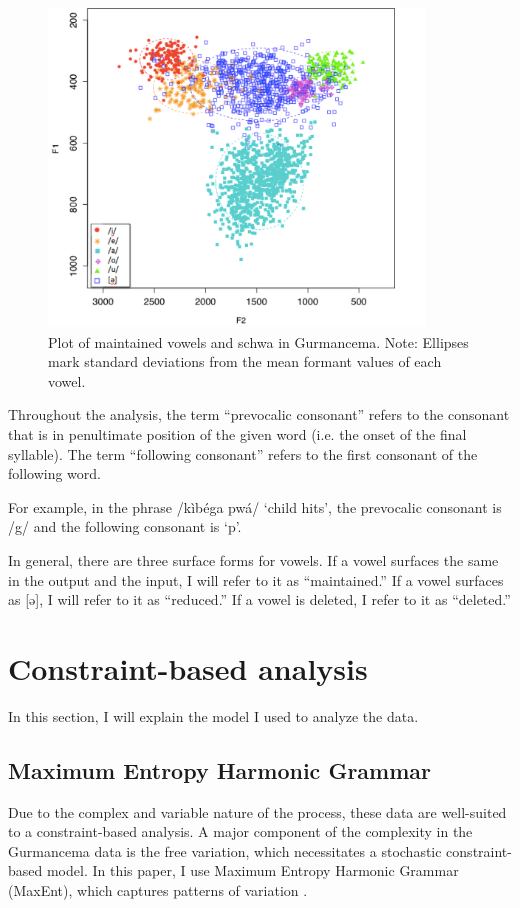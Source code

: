 \documentclass[output=paper,newtxmath,modfonts,nonflat,draftmode]{langsci/langscibook}
\begin{document}
\begin{figure} 
\includegraphics[width=10cm]{figures/ACAL_Vowel_plot.png} %
\caption{Plot of maintained vowels and schwa in Gurmancema. Note: Ellipses mark standard deviations from the mean formant values of each vowel.}
\end{figure}
 

Throughout the analysis, the term “prevocalic consonant” refers to the consonant that is in penultimate position of the given word (i.e. the onset of the final syllable). The term “following consonant” refers to the first consonant of the following word. 

For example, in the phrase /kìbéga pwá/ `child hits', the prevocalic consonant is /g/ and the following consonant is `p'. 

In general, there are three surface forms for vowels. If a vowel surfaces the same in the output and the input, I will refer to it as ``maintained.'' If a vowel surfaces as [ə], I will refer to it as ``reduced.'' If a vowel is deleted, I refer to it as ``deleted.''

\section{Constraint-based analysis}\label{sec:baird:5}
In this section, I will explain the model I used to analyze the data. 

\subsection{Maximum Entropy Harmonic Grammar}\largerpage

Due to the complex and variable nature of the process, these data are well-suited to a constraint-based analysis. A major component of the complexity in the Gurmancema data is the free variation, which necessitates a stochastic constraint-based model. In this paper, I use Maximum Entropy Harmonic Grammar (MaxEnt), which captures patterns of variation \citep{GoldwaterJohnson2003,HayesWilson2008}. 
	 
\end{document}
